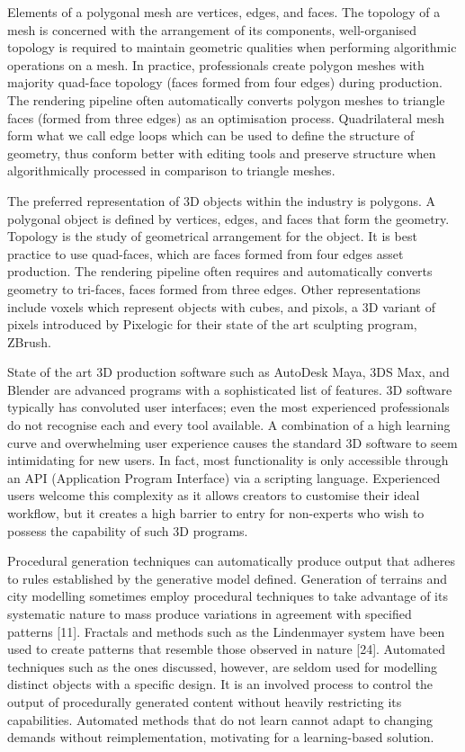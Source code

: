 \documentclass[a4paper, fontsize=15pt, onecolumn]{article} %
\numberwithin{equation}{section} %
\numberwithin{figure}{section} %
\numberwithin{table}{section} %
\begin{document}
Elements of a polygonal mesh are vertices, edges, and faces. The topology of a mesh is concerned with the arrangement of its components, well-organised topology is required to maintain geometric qualities
when performing algorithmic operations on a mesh. In practice, professionals create polygon meshes with majority quad-face topology (faces formed from four edges) during production. The rendering pipeline often automatically converts polygon meshes to triangle faces (formed from three edges) as an optimisation process. Quadrilateral mesh form what we call edge loops which can be used to define the structure of geometry, thus conform better with editing tools and preserve structure when algorithmically processed in comparison to triangle meshes.

The preferred representation of 3D objects within the industry is polygons. A polygonal object is defined by vertices, edges, and faces that form the geometry. Topology is the study of geometrical arrangement for the object. It is best practice to use quad-faces, which are faces formed from four edges asset production. The rendering pipeline often requires and automatically converts geometry to tri-faces, faces formed from three edges. Other representations include voxels which represent objects with cubes, and pixols, a 3D variant of pixels introduced by Pixelogic for their state of the art sculpting program, ZBrush.

State of the art 3D production software such as AutoDesk Maya, 3DS Max, and Blender are advanced
programs with a sophisticated list of features. 3D software typically has convoluted user interfaces; even the most experienced professionals do not recognise each and every tool available. A combination of a high learning curve and overwhelming user experience causes the standard 3D software to seem intimidating for new users. In fact, most functionality is only accessible through an API (Application Program Interface) via a scripting language. Experienced users welcome this complexity as it allows creators to customise their ideal workflow, but it creates a high barrier to entry for non-experts who wish to possess the capability of such 3D programs.

Procedural generation techniques can automatically produce output that adheres to rules established by the generative model defined. Generation of terrains and city modelling sometimes employ procedural techniques to take advantage of its systematic nature to mass produce variations in agreement with specified patterns [11]. Fractals and methods such as the Lindenmayer system have been used to create patterns that resemble those observed in nature [24]. Automated techniques such as the ones discussed, however, are seldom used for modelling distinct objects with a specific design. It is an involved process to control the output of procedurally generated content without heavily restricting its capabilities. Automated methods that do not learn cannot adapt to changing demands without reimplementation, motivating for a learning-based solution.
\end{document}
